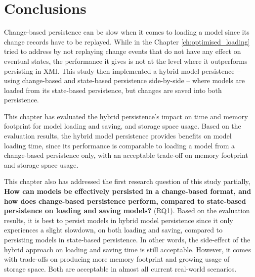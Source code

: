 \section{Conclusions}
\label{sec:conclusions_5}
Change-based persistence can be slow when it comes to loading a model since its change records have to be replayed. While in the Chapter \ref{ch:optimised_loading} tried to address by not replaying change events that do not have any effect on eventual states, the performance it gives is not at the level where it outperforms persisting in XMI. This study then implemented a hybrid model persistence -- using change-based and state-based persistence side-by-side -- where models are loaded from its state-based persistence, but changes are saved into both persistence.

This chapter has evaluated the hybrid persistence's impact on time and memory footprint for model loading and saving, and storage space usage. Based on the evaluation results, the hybrid model persistence provides benefits on model loading time, since its performance is comparable to loading a model from a change-based persistence only, with an acceptable trade-off on memory footprint and storage space usage. 

This chapter also has addressed the first research question of this study partially, \textbf{How can models be effectively persisted in a change-based format, and how does change-based persistence perform, compared to state-based persistence on loading and saving models?} (RQ1). Based on the evaluation results, it is best to persist models in hybrid model persistence since it only experiences a slight slowdown, on both loading and saving, compared to persisting models in state-based persistence. In other words, the side-effect of the hybrid approach on loading and saving time is still acceptable. However, it comes with trade-offs on producing more memory footprint and growing usage of storage space. Both are acceptable in almost all current real-world scenarios.
